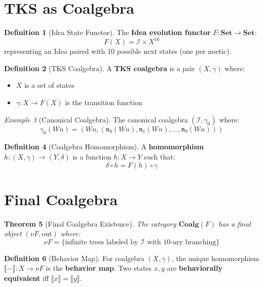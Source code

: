 \documentclass[11pt,twoside,openright]{book}
\theoremstyle{definition}
\newtheorem{definition}{Definition}[chapter]
\theoremstyle{plain}
\newtheorem{theorem}[definition]{Theorem}
\theoremstyle{remark}
\newtheorem{example}[definition]{Example}
\newcommand{\Ideas}{\mathcal{I}}
\newcommand{\Coalg}{\mathbf{Coalg}}          %
\begin{document}
\section{TKS as Coalgebra}

\begin{definition}[Idea State Functor]
\label{def:idea-functor}
The \textbf{Idea evolution functor} $F : \mathbf{Set} \to \mathbf{Set}$:
\[
F(X) = \Ideas \times X^{10}
\]
representing an Idea paired with 10 possible next states (one per noetic).
\end{definition}

\begin{definition}[TKS Coalgebra]
\label{def:tks-coalgebra}
A \textbf{TKS coalgebra} is a pair $(X, \gamma)$ where:
\begin{itemize}
  \item $X$ is a set of states
  \item $\gamma : X \to F(X)$ is the transition function
\end{itemize}
\end{definition}

\begin{example}[Canonical Coalgebra]
\label{ex:canonical-coalg}
The canonical coalgebra $(\Ideas, \gamma_0)$ where:
\[
\gamma_0(Wn) = (Wn, (\mathfrak{n}_0(Wn), \mathfrak{n}_1(Wn), \ldots, \mathfrak{n}_9(Wn)))
\]
\end{example}

\begin{definition}[Coalgebra Homomorphism]
\label{def:coalg-homo}
A \textbf{homomorphism} $h : (X, \gamma) \to (Y, \delta)$ is a function $h : X \to Y$ such that:
\[
\delta \circ h = F(h) \circ \gamma
\]
\end{definition}

\section{Final Coalgebra}

\begin{theorem}[Final Coalgebra Existence]
\label{thm:final-coalg}
The category $\Coalg(F)$ has a final object $(\nu F, \mathrm{out})$ where:
\[
\nu F = \{\text{infinite trees labeled by } \Ideas \text{ with 10-ary branching}\}
\]
\end{theorem}

\begin{definition}[Behavior Map]
\label{def:behavior}
For coalgebra $(X, \gamma)$, the unique homomorphism $\llbracket - \rrbracket : X \to \nu F$ is the \textbf{behavior map}. Two states $x, y$ are \textbf{behaviorally equivalent} iff $\llbracket x \rrbracket = \llbracket y \rrbracket$.
\end{definition}
\end{document}
